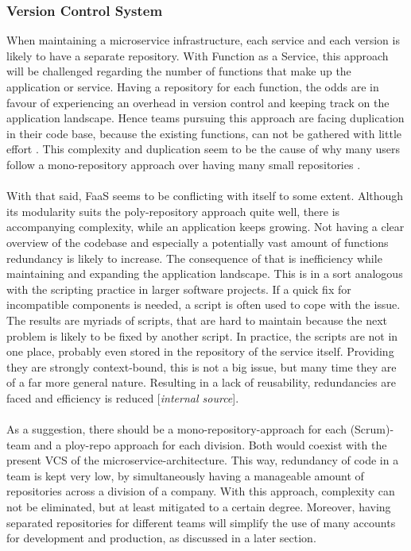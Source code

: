\documentclass[a4paper,twoside,11pt, pagesize]{scrartcl}
\begin{document}
\begin{spacing}{1.2}
\subsubsection{Version Control System}When maintaining a microservice infrastructure, each service and each version is likely to have a separate repository. With Function as a Service, this approach will be challenged regarding the number of functions that make up the application or service. Having a repository for each function, the odds are in favour of experiencing an overhead in version control and keeping track on the application landscape. Hence teams pursuing this approach are facing duplication in their code base, because the existing functions, can not be gathered with little effort \cite{racicot2019quality}. This complexity and duplication seem to be the cause of why many users follow a mono-repository approach over having many small repositories \cite{brousse2019issue}.\\\\ With that said, FaaS seems to be conflicting with itself to some extent. Although its modularity suits the poly-repository approach quite well, there is accompanying complexity, while an application keeps growing. Not having a clear overview of the codebase and especially a potentially vast amount of functions redundancy is likely to increase. The consequence of that is inefficiency while maintaining and expanding the application landscape. This is in a sort analogous with the scripting practice in larger software projects. If a quick fix for incompatible components is needed, a script is often used to cope with the issue. The results are myriads of scripts, that are hard to maintain because the next problem is likely to be fixed by another script. In practice, the scripts are not in one place, probably even stored in the repository of the service itself. Providing they are strongly context-bound, this is not a big issue, but many time they are of a far more general nature. Resulting in a lack of reusability, redundancies are faced and efficiency is reduced [\textit{internal source}].\\\\ As a suggestion, there should be a mono-repository-approach for each (Scrum)-team and a ploy-repo approach for each division. Both would coexist with the present VCS of the microservice-architecture. This way, redundancy of code in a team is kept very low, by simultaneously having a manageable amount of repositories across a division of a company. With this approach, complexity can not be eliminated, but at least mitigated to a certain degree. Moreover, having separated repositories for different teams will simplify the use of many accounts for development and production, as discussed in a later section.\\\\ 

\end{spacing}
\end{document}
